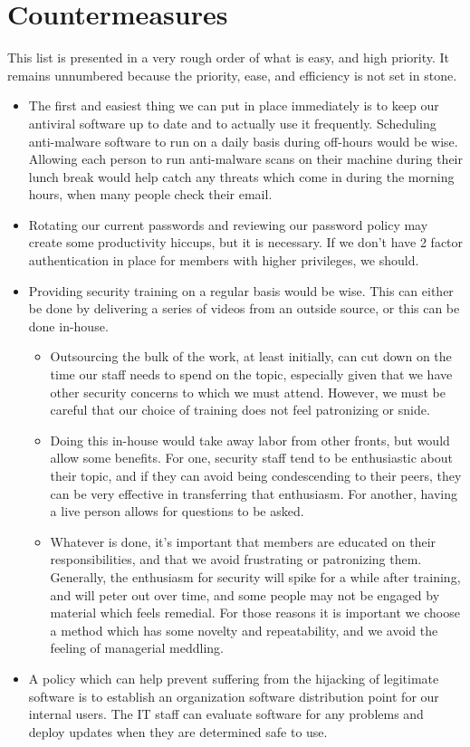 \hypertarget{countermeasures}{%
\section{Countermeasures}\label{countermeasures}}

This list is presented in a very rough order of what is easy, and high
priority. It remains unnumbered because the priority, ease, and
efficiency is not set in stone.

\begin{itemize}
\item
  The first and easiest thing we can put in place immediately is to keep
  our antiviral software up to date and to actually use it frequently.
  Scheduling anti-malware software to run on a daily basis during
  off-hours would be wise. Allowing each person to run anti-malware
  scans on their machine during their lunch break would help catch any
  threats which come in during the morning hours, when many people check
  their email.
\item
  Rotating our current passwords and reviewing our password policy may
  create some productivity hiccups, but it is necessary. If we don't
  have 2 factor authentication in place for members with higher
  privileges, we should.
\item
  Providing security training on a regular basis would be wise. This can
  either be done by delivering a series of videos from an outside
  source, or this can be done in-house.

  \begin{itemize}
  \item
    Outsourcing the bulk of the work, at least initially, can cut down
    on the time our staff needs to spend on the topic, especially given
    that we have other security concerns to which we must attend.
    However, we must be careful that our choice of training does not
    feel patronizing or snide.
  \item
    Doing this in-house would take away labor from other fronts, but
    would allow some benefits. For one, security staff tend to be
    enthusiastic about their topic, and if they can avoid being
    condescending to their peers, they can be very effective in
    transferring that enthusiasm. For another, having a live person
    allows for questions to be asked.
  \item
    Whatever is done, it's important that members are educated on their
    responsibilities, and that we avoid frustrating or patronizing them.
    Generally, the enthusiasm for security will spike for a while after
    training, and will peter out over time, and some people may not be
    engaged by material which feels remedial. For those reasons it is
    important we choose a method which has some novelty and
    repeatability, and we avoid the feeling of managerial meddling.
  \end{itemize}
\item
  A policy which can help prevent suffering from the hijacking of
  legitimate software is to establish an organization software
  distribution point for our internal users. The IT staff can evaluate
  software for any problems and deploy updates when they are determined
  safe to use.


\end{itemize}
